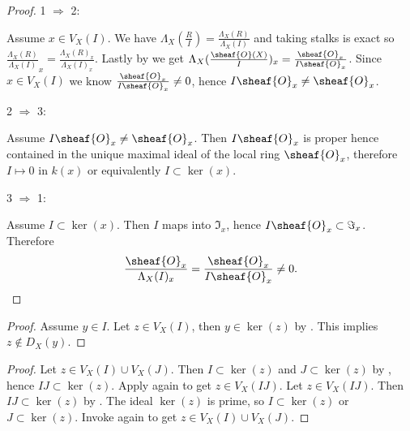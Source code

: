 \begin{proof}
1 $\Rightarrow$ 2:

Assume $x\in V_X(I)$.
We have $\Lambda_X(\frac{R}{I})= \frac{\Lambda_X(R)}{\Lambda_X(I)}$ and taking stalks is exact so $\frac{\Lambda_X(R)}{\Lambda_X(I)}_x = \frac{\Lambda_X(R)_x}{\Lambda_X(I)_x}$. Lastly by  we get $\Lambda_X(\frac{\sheaf{O}(X)}{I})_x = \frac{\sheaf{O}_x}{I\sheaf{O}_x}$.
Since $x \in V_X(I)$ we know $\frac{\sheaf{O}_x}{I\sheaf{O}_x} \neq 0$, hence $I\sheaf{O}_x \neq \sheaf{O}_x$.

2 $\Rightarrow$ 3: 

Assume $I\sheaf{O}_x\neq \sheaf{O}_x$. 
Then $I\sheaf{O}_x$ is proper hence contained in the unique maximal ideal of the local ring $\sheaf{O}_x$, 
therefore $I\mapsto 0$ in $k(x)$ or equivalently $I\subset \ker(x)$.

3 $\Rightarrow$ 1:

Assume $I \subset \ker(x)$. Then $I$ maps into $\Im_x$, hence $I\sheaf{O}_x \subset \Im_x$. Therefore 
\[\frac{\sheaf{O}_x}{\Lambda_X(I)_x} = \frac{\sheaf{O}_x}{I\sheaf{O}_x} \neq 0.\]

\end{proof}
\begin{proof}
Assume $y\in I$.
Let $z\in V_X(I)$, then $y\in \ker(z)$ by .
This implies $z\not\in D_X(y)$.
\end{proof}
\begin{proof}
Let $z\in V_X(I)\cup V_X(J)$. Then $I\subset \ker(z)$ and $J\subset \ker(z)$ by , hence $IJ\subset \ker(z)$.
Apply  again to get $z\in V_X(IJ)$.
Let $z\in V_X(IJ)$. Then $IJ \subset \ker(z)$ by . The ideal $\ker(z)$ is prime, so $I\subset \ker(z)$ or $J\subset \ker(z)$. Invoke  again to get $z\in V_X(I)\cup V_X(J)$.
\end{proof}
